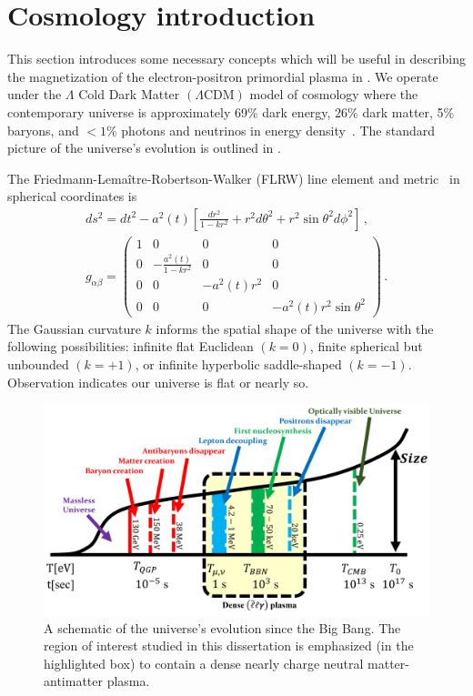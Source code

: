 \section{Cosmology introduction}
\label{sec:flrw}
\noindent This section introduces some necessary concepts which will be useful in describing the magnetization of the electron-positron primordial plasma in . We operate under the $\Lambda$ Cold Dark Matter $(\Lambda\mathrm{CDM})$ model of cosmology where the contemporary universe is approximately 69\% dark energy, 26\% dark matter, 5\% baryons, and $<1$\% photons and neutrinos in energy density~\citep{Davis:2003ad,Planck:2018vyg}. The standard picture of the universe's evolution is outlined in .

The Friedmann-Lema{\^i}tre-Robertson-Walker (FLRW) line element and metric~\citep{weinberg1972gravitation} in spherical coordinates is
\begin{gather}
    \label{FLRW} ds^2=dt^2-a^2(t)\left[\frac{dr^2}{1-kr^{2}}+r^{2}d\theta^2+r^{2}\sin\theta^{2}d\phi^2\right]\,,\\
    g_{\alpha\beta}=
    \begin{pmatrix}
        1&0&0&0\\
        0&-\frac{a^{2}(t)}{1-kr^{2}}&0&0\\
        0&0&-a^{2}(t)r^{2}&0\\
        0&0&0&-a^{2}(t)r^{2}\sin\theta^{2}
    \end{pmatrix}\,.
\end{gather}
The Gaussian curvature $k$ informs the spatial shape of the universe with the following possibilities: infinite flat Euclidean $(k=0)$, finite spherical but unbounded $(k=+1)$, or infinite hyperbolic saddle-shaped $(k=-1)$. Observation indicates our universe is flat or nearly so.

\begin{figure}[ht]
 \centering
 \includegraphics[width=0.95\linewidth]{plots/chap01intro/thesis_universe.png}
 \caption{A schematic of the universe's evolution since the Big Bang. The region of interest studied in this dissertation is emphasized (in the highlighted box) to contain a dense nearly charge neutral matter-antimatter plasma.}
 \label{fig:cosmo} 
\end{figure}

